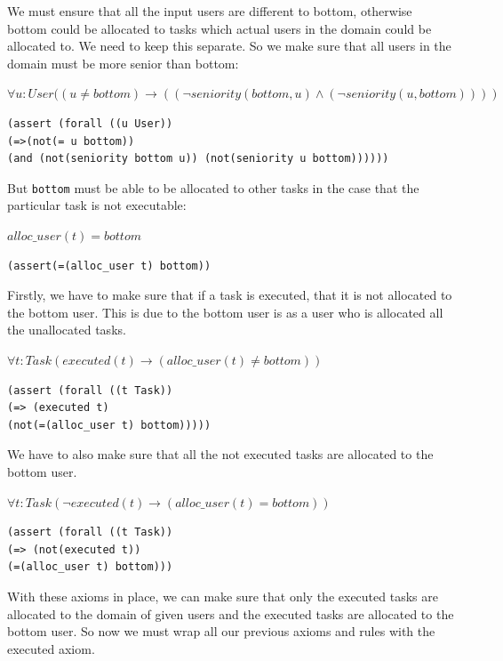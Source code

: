 \documentclass[a4paper]{report}
\begin{document}
We must ensure that all the input users are different to bottom, otherwise bottom could be allocated to tasks which actual users in the domain could be allocated to. We need to keep this separate. So we make sure that all users in the domain must be more senior than bottom:
\begin{center}
$\forall u : User ((u \neq bottom) \longrightarrow ((\neg seniority(bottom, u) \wedge (\neg seniority(u, bottom))))$
\end{center}
\begin{lstlisting}[frame=single]
(assert (forall ((u User))
(=>(not(= u bottom))
(and (not(seniority bottom u)) (not(seniority u bottom))))))
\end{lstlisting}

But \texttt{bottom} must be able to be allocated to other tasks in the case that the particular task is not executable:
\begin{center}
$alloc\_user(t) = bottom$
\end{center}
\begin{lstlisting}[frame=single]
(assert(=(alloc_user t) bottom))
\end{lstlisting}

Firstly, we have to make sure that if a task is executed, that it is not allocated to the bottom user. This is due to the bottom user is as a user who is allocated all the unallocated tasks.
\begin{center}
$\forall t : Task (executed(t) \longrightarrow ( alloc\_user(t) \neq bottom))$
\end{center}
\begin{lstlisting}[frame=single]
(assert (forall ((t Task))
(=> (executed t)
(not(=(alloc_user t) bottom)))))
\end{lstlisting}

We have to also make sure that all the not executed tasks are allocated to the bottom user. 
\begin{center}
$\forall t : Task (\neg executed(t) \longrightarrow (alloc\_user(t) = bottom))$
\end{center}
\begin{lstlisting}[frame=single]
(assert (forall ((t Task))
(=> (not(executed t))
(=(alloc_user t) bottom)))
\end{lstlisting}

With these axioms in place, we can make sure that only the executed tasks are allocated to the domain of given users and the executed tasks are allocated to the bottom user. So now we must  wrap all our previous axioms and rules with the executed axiom.\\
\end{document}
